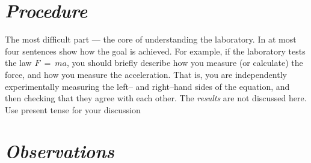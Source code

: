 \documentclass[epsfig,12pt]{article}
\begin{document}
\section*{\textit{Procedure}}

	The most difficult part --- the core of understanding the laboratory.
	In at most four sentences show how the goal is achieved.
	For example, if the laboratory tests the law $ F ~=~ m a $,
	you should briefly describe how you measure (or calculate) the force,
	and how you measure the acceleration.
	That is, you are independently experimentally measuring the left-- and right--hand sides 
	of the equation, and then checking that they agree with each other.
	The \emph{results} are not discussed here.
	Use present tense for your discussion
	

\section*{\textit{Observations}}
\end{document}

